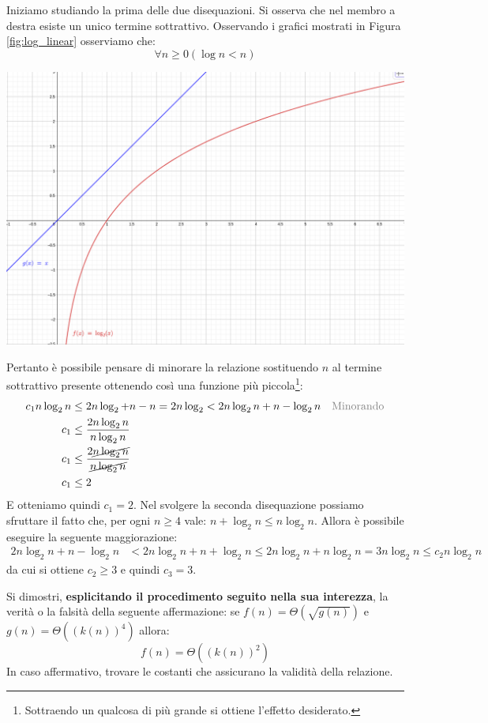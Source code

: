 Iniziamo studiando la prima delle due disequazioni. Si osserva che nel membro a destra esiste un unico termine sottrattivo. Osservando i grafici mostrati in Figura \ref{fig:log_linear} osserviamo che:
\begin{displaymath}
	\forall n \geq 0 (\log n < n)
\end{displaymath}
\begin{center}
	\includegraphics[scale=.2]{res/log_linear}
	\label{fig:log_linear}
\end{center}
Pertanto è possibile pensare di minorare la relazione sostituendo $n$ al termine sottrattivo presente ottenendo così una funzione più piccola\footnote{Sottraendo un qualcosa di più grande si ottiene l'effetto desiderato.}:
\begin{align*}
	c_{1} n \log_{2} n & \leq 2n \log_{2} + n -n = 2n \log_{2} < 2n \log_{2} n + n - \log_{2} n & \text{\textcolor{gray}{Minorando}}\\
	c_{1} &\leq \frac{2n \log_{2} n}{n \log_{2}n} \\
	c_{1} &\leq \frac{2 \cancel{n \log_{2} n}}{\cancel{n \log_{2} n}}\\
	c_{1} &\leq 2
\end{align*}
E otteniamo quindi $c_{1} = 2$. Nel svolgere la seconda disequazione possiamo sfruttare il fatto che, per ogni $n \geq 4$ vale: $n + \log_{2} n \leq n \log_{2} n$. Allora è possibile eseguire la seguente maggiorazione:
\begin{align*}
	2n \log_{2} n + n - \log_{2} n &< 2n \log_{2} n + n + \log_{2} n \leq 2n \log_{2} n + n \log_{2} n = 3n \log_{2} n \leq c_{2} n \log_{2} n
\end{align*}
da cui si ottiene $c_{2} \geq 3$ e quindi $c_{3}=3$. \hfill \blacksquare

\begin{exsbox}
	Si dimostri, \textbf{esplicitando il procedimento seguito nella sua interezza}, la verità o la falsità della seguente affermazione: se $f(n) = \Theta(\sqrt{g(n)})$ e $g(n)= \Theta((k(n))^{4})$ allora:
	\begin{displaymath}
		f(n) = \Theta((k(n))^{2})
	\end{displaymath}
	In caso affermativo, trovare le costanti che assicurano la validità della relazione.
\end{exsbox}
